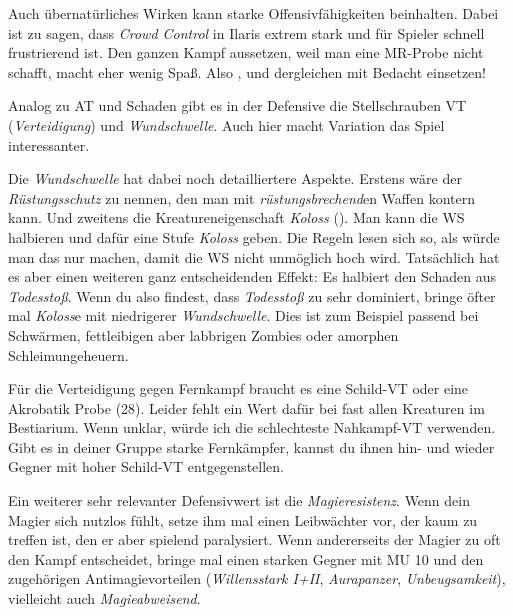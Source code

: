 Auch übernatürliches Wirken kann starke Offensivfähigkeiten beinhalten.
Dabei ist zu sagen, dass \textit{Crowd Control} in Ilaris extrem stark und für Spieler schnell frustrierend ist.
Den ganzen Kampf aussetzen, weil man eine MR-Probe nicht schafft, macht eher wenig Spaß.
Also ,  und dergleichen mit Bedacht einsetzen!

\spaltenende
\begin{center}
\end{center}
\spaltenanfang

Analog zu AT und Schaden gibt es in der Defensive die Stellschrauben VT (\textit{Verteidigung}) und \textit{Wundschwelle}.
Auch hier macht Variation das Spiel interessanter.

Die \textit{Wundschwelle} hat dabei noch detailliertere Aspekte. Erstens wäre der \textit{Rüstungsschutz} zu nennen, den man mit \textit{rüstungsbrechend}en Waffen kontern kann. Und zweitens die Kreatureneigenschaft \textit{Koloss} (). Man kann die WS halbieren und dafür eine Stufe \textit{Koloss} geben. Die Regeln lesen sich so, als würde man das nur machen, damit die WS nicht unmöglich hoch wird. Tatsächlich hat es aber einen weiteren ganz entscheidenden Effekt: Es halbiert den Schaden aus \textit{Todesstoß}. Wenn du also findest, dass \textit{Todesstoß} zu sehr dominiert, bringe öfter mal \textit{Koloss}e mit niedrigerer \textit{Wundschwelle}. Dies ist zum Beispiel passend bei Schwärmen, fettleibigen aber labbrigen Zombies oder amorphen Schleimungeheuern. 
\neuespalte

\mbox{}

\platz

Für die Verteidigung gegen Fernkampf braucht es eine Schild-VT oder eine Akrobatik Probe (28). Leider fehlt ein Wert dafür bei fast allen Kreaturen im Bestiarium. Wenn unklar, würde ich die schlechteste Nahkampf-VT verwenden. Gibt es in deiner Gruppe starke Fernkämpfer, kannst du ihnen hin- und wieder Gegner mit hoher Schild-VT entgegenstellen.

\smallskip

Ein weiterer sehr relevanter Defensivwert ist die \textit{Magieresistenz}.
Wenn dein Magier sich nutzlos fühlt, setze ihm mal einen Leibwächter vor, der kaum zu treffen ist, den er aber spielend paralysiert.
Wenn andererseits der Magier zu oft den Kampf entscheidet, bringe mal einen starken Gegner mit MU 10 und den zugehörigen Antimagievorteilen (\textit{Willensstark I+II}, \textit{Aurapanzer}, \textit{Unbeugsamkeit}), vielleicht auch \textit{Magieabweisend}.



